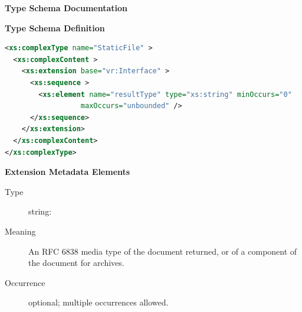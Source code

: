 \documentclass{ivoa}
\begin{document}
\begin{generated}
\begingroup
        \renewcommand*\descriptionlabel[1]{%
        \hbox to 5.5em{\emph{#1}\hfil}}\vspace{2ex}\noindent\textbf{ Type Schema Documentation}



\vspace{1ex}\noindent\textbf{ Type Schema Definition}

\begin{lstlisting}[language=XML,basicstyle=\footnotesize]
<xs:complexType name="StaticFile" >
  <xs:complexContent >
    <xs:extension base="vr:Interface" >
      <xs:sequence >
        <xs:element name="resultType" type="xs:string" minOccurs="0"
                  maxOccurs="unbounded" />
      </xs:sequence>
    </xs:extension>
  </xs:complexContent>
</xs:complexType>
\end{lstlisting}

\vspace{0.5ex}\noindent\textbf{ Extension Metadata Elements}

\begingroup\small\begin{bigdescription}\item[Element \xmlel{resultType}]
\begin{description}
\item[Type] string: 
\item[Meaning]
                An RFC 6838 media type of the document returned, or of
                a component of the document for archives.

\item[Occurrence] optional; multiple occurrences allowed.

\end{description}


\end{bigdescription}\endgroup

\endgroup
\end{generated}
\end{document}
